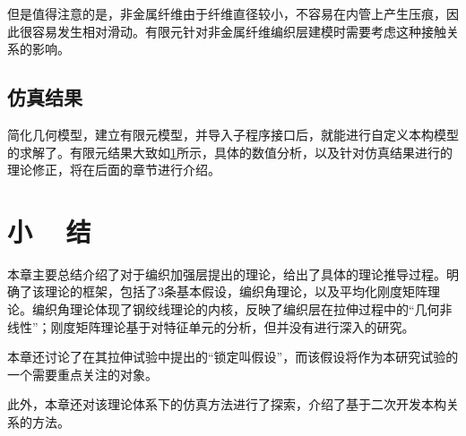 但是值得注意的是，非金属纤维由于纤维直径较小，不容易在内管上产生压痕，因此很容易发生相对滑动。有限元针对非金属纤维编织层建模时需要考虑这种接触关系的影响。

\subsection{仿真结果}

简化几何模型，建立有限元模型，并导入\uma 子程序接口后，\aba 就能进行自定义本构模型的求解了。有限元结果大致如\ref{fig:results-2}所示，具体的数值分析，以及针对仿真结果进行的理论修正，将在后面的章节进行介绍。
\begin{figure}[!htp]
\centering
{}
\hspace{0.5cm}
\label{fig:results-2}
\end{figure}


\section{小 ~ 结}

本章主要总结介绍了\ha 对于编织加强层提出的理论，给出了具体的理论推导过程。明确了该理论的框架，包括了3条基本假设，编织角理论，以及平均化刚度矩阵理论。编织角理论体现了钢绞线理论的内核，反映了编织层在拉伸过程中的“几何非线性”；刚度矩阵理论基于对特征单元的分析，但\ha 并没有进行深入的研究。

本章还讨论了\ha 在其拉伸试验中提出的“锁定叫假设”，而该假设将作为本研究试验的一个需要重点关注的对象。

此外，本章还对该理论体系下的仿真方法进行了探索，介绍了基于\uma 二次开发本构关系的方法。



